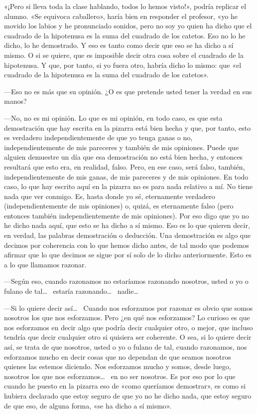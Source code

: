\documentclass[draft,9pt,letterpaper,twocolumn,openany]{extbook}
\newcommand{\notar}[1]{\marginnote{\small\sffamily #1}[-.8em]}
\begin{document}
«¡Pero si lleva toda la clase hablando, todos lo hemos
visto!», podría replicar el alumno. «Se equivoca caballero»,
haría bien en responder el profesor, «yo he movido los labios
y he pronunciado sonidos, pero no soy yo quien ha dicho
que el cuadrado de la hipotenusa es la suma del cuadrado
de los catetos. Eso no lo he dicho, lo he demostrado. Y eso
es tanto como decir que eso se ha dicho a sí mismo. O si
se quiere, que es imposible decir otra cosa sobre el
cuadrado de la hipotenusa. Y que, por tanto, si yo fuera otro,
habría dicho lo mismo: que «el cuadrado de la hipotenusa es
la suma del cuadrado de los catetos».

—Eso no es más que su opinión. ¿O es que pretende usted
tener la verdad en sus manos?

—No, no es mi opinión. Lo que es mi opinión, en todo caso,
es que esta demostración que hay escrita en la pizarra está
bien hecha y que, por tanto, esto es verdadero
independientemente de que yo tenga ganas o
no, independientemente de mis pareceres y también de mis
opiniones. Puede que alguien demuestre un día que esa
demostración no está bien hecha, y entonces resultará que
esto era, en realidad, falso. Pero, en ese caso, será falso,
también, independientemente de mis ganas, de mis
pareceres y de mis opiniones. En todo caso, lo que hay
escrito aquí en la pizarra no es para nada relativo a mí. No
tiene nada que ver conmigo. Es, hasta donde yo sé,
eternamente verdadero (independientemente de mis
opiniones) o, quizá, es eternamente falso (pero entonces
también independientemente de mis opiniones). Por eso
digo que yo no he dicho nada aquí, que esto se ha dicho a
sí mismo. Eso es lo que quieren decir, en verdad, las
palabras demostración o deducción. Una demostración es
algo que decimos por coherencia con lo que hemos dicho
antes, de tal modo que podemos afirmar que lo que
decimos se sigue por sí solo de lo dicho anteriormente.
Esto es a lo que llamamos razonar.

—Según eso, cuando razonamos no estaríamos razonando
nosotros, usted o yo o fulano de tal\ldots~ estaría razonando\ldots~
nadie\ldots~

—Si lo quiere decir así\ldots~ Cuando nos esforzamos por
razonar es obvio que somos nosotros los que nos
esforzamos. Pero ¿en qué nos esforzamos? Lo curioso es
que nos esforzamos en decir algo que podría decir cualquier
otro, o mejor, que incluso tendría que decir cualquier otro si
quisiera ser coherente. O sea, si lo quiere decir así, se trata
de que nosotros, usted o yo o fulano de tal, cuando
razonamos, nos esforzamos mucho en decir cosas que no
dependan de que seamos nosotros quienes las estemos
diciendo. Nos esforzamos mucho y somos, desde luego,
nosotros los que nos esforzamos\ldots~ en no ser nosotros. Es
por eso por lo que cuando he puesto en la pizarra eso de
«como queríamos demostrar», es como si hubiera declarado
que estoy seguro de que yo no he dicho nada, que estoy
seguro de que eso, de alguna forma, «se ha dicho a sí
mismo».
\end{document}
